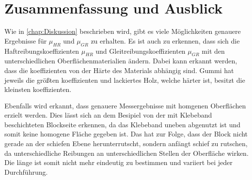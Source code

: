 \section{Zusammenfassung und Ausblick}

Wie in \autoref{chap:Diskussion} beschrieben wird, gibt es viele Möglichkeiten genauere Ergebnisse für $\mu_{HR}$ und $\mu_{GR}$ zu erhalten. Es ist auch zu erkennen, dass sich die Haftreibungskoeffizienten $\mu_{HR}$ und Gleitreibungskoeffizienten $\mu_{GR}$ mit den unterschiedlichen Oberflächenmaterialien ändern. Dabei kann erkannt werden, dass die koeffizienten von der Härte des Materials abhängig sind. Gummi hat jeweils die größten koeffizienten und lackiertes Holz, welche härter ist, besitzt die kleinsten koeffizienten.

Ebenfalls wird erkannt, dass genauere Messergebnisse mit homgenen Oberflächen erzielt werden. Dies lässt sich an dem Besipiel von der mit Klebeband beschichteten Blockseite erkennen, da das Klebeband uneben abgenutzt ist und somit keine homogene Fläche gegeben ist. Das hat zur Folge, dass der Block nicht gerade an der schiefen Ebene herunterrutscht, sondern anfängt schief zu rutschen, da unterschiedliche Reibungen an unterschiedlichen Stellen der Oberfläche wirken. Die länge ist somit nicht mehr eindeutig zu bestimmen und variiert bei jeder Durchführung.